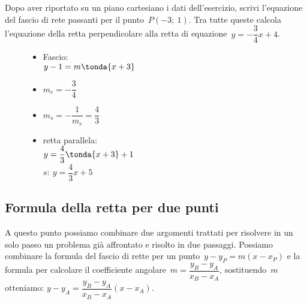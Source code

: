  \begin{esempio}
  Dopo aver riportato su un piano cartesiano i dati dell'esercizio,
  scrivi l'equazione del fascio di rete passanti per il punto~\(P(-3;~1)\).
  Tra tutte queste calcola l'equazione della retta perpendicolare alla retta 
  di equazione~\(y=-\dfrac{3}{4}x+4\).

\begin{inaccessibleblock}
 \begin{figure}[h]
\centering \hspace{-5mm}
 \begin{minipage}[]{.40\textwidth}
  \begin{itemize}
  \item Fascio: \\
  \(y -1 = m \tonda{x +3}\)
  \item \(m_r = -\dfrac{3}{4}\)
  \item \(m_s = - \dfrac{1}{m_r} = \dfrac{4}{3}\)
  \item retta parallela: \\
  \(y = \dfrac{4}{3} \tonda{x +3} +1\)\\
  \(s:~y = \dfrac{4}{3} x +5\)
  \end{itemize}
 \end{minipage}
 \begin{minipage}[]{.60\textwidth}
   \centering \fascioperp
 \end{minipage}
\label{fig:fascioperp}
\end{figure}
\end{inaccessibleblock}
 \end{esempio}

\subsection{Formula della retta per due punti}

A questo punto possiamo combinare due argomenti trattati per risolvere in un
solo passo un problema già affrontato e risolto in due passaggi. 
Possiamo combinare la formula del fascio di rette per un 
punto~\(y - y_P = m (x - x_P)\)
e la formula per calcolare il 
coefficiente angolare~\(m = \dfrac{y_B - y_A}{x_B - x_A}\), 
sostituendo~\(m\) otteniamo:
\(y - y_A = \dfrac{y_B - y_A}{x_B - x_A} (x - x_A)\).

